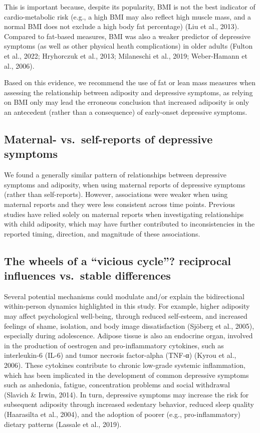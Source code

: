 \documentclass[
  letterpaper,
  DIV=11,
  numbers=noendperiod]{scrreport}
\begin{document}
This is important because, despite its popularity, BMI is not the best
indicator of cardio-metabolic risk (e.g., a high BMI may also reflect
high muscle mass, and a normal BMI does not exclude a high body fat
percentage) (Liu et al., 2013). Compared to fat-based measures, BMI was
also a weaker predictor of depressive symptoms (as well as other
physical heath complications) in older adults (Fulton et al., 2022;
Hryhorczuk et al., 2013; Milaneschi et al., 2019; Weber-Hamann et al.,
2006).

Based on this evidence, we recommend the use of fat or lean mass
measures when assessing the relationship between adiposity and
depressive symptoms, as relying on BMI only may lead the erroneous
conclusion that increased adiposity is only an antecedent (rather than a
consequence) of early-onset depressive symptoms.

\subsection{Maternal- vs.~self-reports of depressive
symptoms}\label{maternal--vs.-self-reports-of-depressive-symptoms}

We found a generally similar pattern of relationships between depressive
symptoms and adiposity, when using maternal reports of depressive
symptoms (rather than self-reports). However, associations were weaker
when using maternal reports and they were less consistent across time
points. Previous studies have relied solely on maternal reports when
investigating relationships with child adiposity, which may have further
contributed to inconsistencies in the reported timing, direction, and
magnitude of these associations.

\subsection{The wheels of a ``vicious cycle''? reciprocal influences
vs.~stable
differences}\label{the-wheels-of-a-vicious-cycle-reciprocal-influences-vs.-stable-differences}

Several potential mechanisms could modulate and/or explain the
bidirectional within-person dynamics highlighted in this study. For
example, higher adiposity may affect psychological well-being, through
reduced self-esteem, and increased feelings of shame, isolation, and
body image dissatisfaction (Sjöberg et al., 2005), especially during
adolescence. Adipose tissue is also an endocrine organ, involved in the
production of oestrogen and pro-inflammatory cytokines, such as
interleukin-6 (IL-6) and tumor necrosis factor-alpha (TNF-α) (Kyrou et
al., 2006). These cytokines contribute to chronic low-grade systemic
inflammation, which has been implicated in the development of common
depressive symptoms such as anhedonia, fatigue, concentration problems
and social withdrawal (Slavich \& Irwin, 2014). In turn, depressive
symptoms may increase the risk for subsequent adiposity through
increased sedentary behavior, reduced sleep quality (Haarasilta et al.,
2004), and the adoption of poorer (e.g., pro-inflammatory) dietary
patterns (Lassale et al., 2019).
\end{document}
